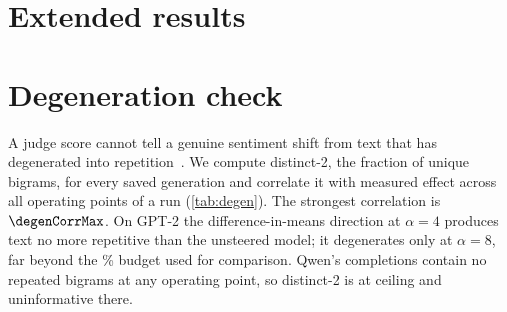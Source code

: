 \documentclass[11pt,a4paper]{article}
\theoremstyle{remark}
\begin{document}
\FloatBarrier
\section{Extended results}
\label{app:extended}

\begin{table}[!htbp]
  \centering\small
  \caption{\textbf{SAE quality per run} (mean $\pm$ s.d.\ over seeds). Routing and occupancy are
  defined only for CG-SAE. Dead latents: latents that never fire on a 40k-token validation subsample.}
  \label{tab:quality}
  
\end{table}

\begin{table}[!htbp]
  \centering\small
  \caption{\textbf{Calibration of the squared-mean penalty} (GPT-2 L8 sentiment, $\tau=0.20$, one seed).}
  \label{tab:sqcalib}
  
\end{table}

\begin{table}[!htbp]
  \centering\small
  \caption{\textbf{Raw leakage is not scale-invariant.} A rescaling that leaves separation unchanged
  divides raw leakage by the scale factor; normalised leakage is unaffected.}
  \label{tab:rescale}
  
\end{table}

\FloatBarrier
\section{Degeneration check}
\label{app:degeneration}

A judge score cannot tell a genuine sentiment shift from text that has degenerated into
repetition~\citep{holtzman2020degeneration}. We compute distinct-2, the fraction of unique bigrams,
for every saved generation and correlate it with measured effect across all operating points of a
run (\cref{tab:degen}). The strongest correlation is $\degenCorrMax$. On GPT-2 the difference-in-means
direction at $\alpha=4$ produces text no more repetitive than the unsteered model; it degenerates
only at $\alpha=8$, far beyond the \budget\% budget used for comparison. Qwen's completions contain
no repeated bigrams at any operating point, so distinct-2 is at ceiling and uninformative there.

\begin{table}[!htbp]
  \centering\small
  \caption{\textbf{Repetition and measured effect} (sentiment runs).}
  \label{tab:degen}
  
\end{table}
\end{document}
